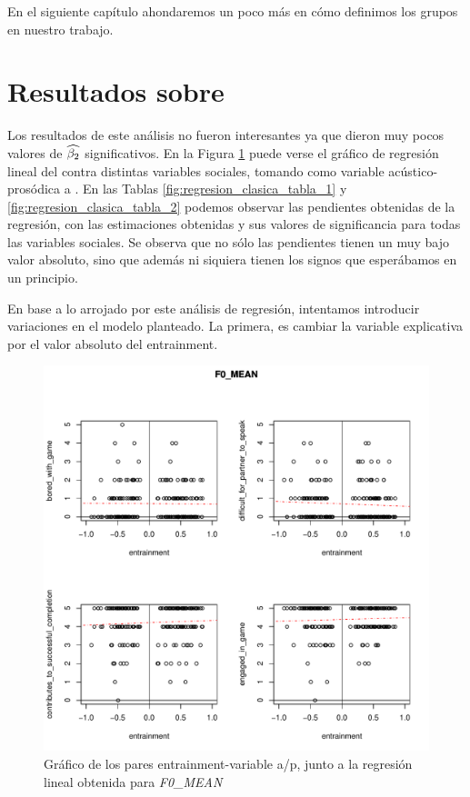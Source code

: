 En el siguiente capítulo ahondaremos un poco más en cómo definimos los grupos en nuestro trabajo.

\section{Resultados sobre \entrainment}

Los resultados de este análisis no fueron interesantes ya que dieron muy pocos valores de $\widehat{\beta_2}$ significativos. En la Figura \ref{fig:regresion_clasica} puede verse el gráfico de regresión lineal del \entrainment contra distintas variables sociales, tomando como variable acústico-prosódica a \FOMEAN. En las Tablas \ref{fig:regresion_clasica_tabla_1} y \ref{fig:regresion_clasica_tabla_2} podemos observar las pendientes obtenidas de la regresión, con las estimaciones obtenidas y sus valores de significancia para todas las variables sociales. Se observa que no sólo las pendientes tienen un muy bajo valor absoluto, sino que además ni siquiera tienen los signos que esperábamos en un principio.

En base a lo arrojado por este análisis de regresión, intentamos introducir variaciones en el modelo planteado. La primera, es cambiar la variable explicativa por el valor absoluto del entrainment.


\begin{figure}[t!]
\includegraphics[width=15cm]{images/regression_F0_MEAN_1.pdf}
\caption{Gráfico de los pares entrainment-variable a/p, junto a la regresión lineal obtenida para \emph{F0\_MEAN}}
\label{fig:regresion_clasica}
\end{figure}



